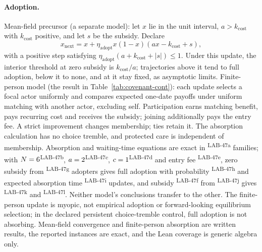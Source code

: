 \documentclass[pdflatex,sn-basic]{sn-jnl}%
\newcommand{\rec}[1]{\ifannotated\textsuperscript{\textcolor{blue!60!black}{\tiny#1}}\fi}
\begin{document}
\begin{appendices}
\paragraph{Adoption.} Mean-field precursor (a separate model): let $x$ lie in the unit interval, $a>k_{\mathrm{cost}}$ with $k_{\mathrm{cost}}$ positive, and let $s$ be the subsidy. Declare
\[
 x_{\mathrm{next}}=x+\eta_{\mathrm{adopt}}x(1-x)(ax-k_{\mathrm{cost}}+s),
\]
with a positive step satisfying $\eta_{\mathrm{adopt}}(a+k_{\mathrm{cost}}+|s|)\le1$. Under this update, the interior threshold at zero subsidy is $k_{\mathrm{cost}}/a$; trajectories above it tend to full adoption, below it to none, and at it stay fixed, as asymptotic limits. Finite-person model (the result in Table~\ref{tab:covenant-cont}): each update selects a focal actor uniformly and compares expected one-date payoffs under uniform matching with another actor, excluding self. Participation earns matching benefit, pays recurring cost and receives the subsidy; joining additionally pays the entry fee. A strict improvement changes membership; ties retain it. The absorption calculation has no choice tremble, and protected care is independent of membership. Absorption and waiting-time equations are exact in \numDFourteenFamilies\rec{LAB-47a} families; with $N=6$\rec{LAB-47b}, $a=2$\rec{LAB-47c}, $c=1$\rec{LAB-47d} and entry fee \numDFourteenEntry\rec{LAB-47e}, zero subsidy from \numDFourteenStartPlain\rec{LAB-47g} adopters gives full adoption with probability \numDFourteenProbPlain\rec{LAB-47h} and expected absorption time \numDFourteenTimePlain\rec{LAB-47i} updates, and subsidy \numDFourteenSubsidy\rec{LAB-47f} from \numDFourteenStartSubsidy\rec{LAB-47j} gives \numDFourteenProbSubsidy\rec{LAB-47k} and \numDFourteenTimeSubsidy\rec{LAB-47l}. Neither model's conclusions transfer to the other. The finite-person update is myopic, not empirical adoption or forward-looking equilibrium selection; in the declared persistent choice-tremble control, full adoption is not absorbing. Mean-field convergence and finite-person absorption are written results, the reported instances are exact, and the Lean coverage is generic algebra only.


\end{appendices}
\end{document}
